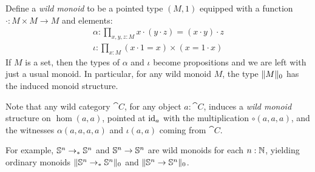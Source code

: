 \documentclass[english,a4paper]{lmcs}
\begin{document}
\begin{rem}
  Define a \emph{wild monoid} to be a pointed type $(M,1)$ equipped with a
  function $\cdot : M \times M \to M$ and elements:
  \begin{gather*}
    \alpha: \prod_{x,y,z:M}x\cdot(y\cdot z) = (x\cdot y) \cdot z \\
    \iota: \prod_{x:M} (x\cdot 1 = x) \times (x = 1 \cdot x)
  \end{gather*}
  If $M$ is a set, then the types of $\alpha$ and $\iota$ become propositions
  and we are left with just a usual monoid. In particular, for any wild monoid
  $M$, the type $\lVert M\rVert_0$ has the induced monoid structure.

  Note that any wild category $\cat C$, for any object $a:\cat C$, induces a
  \emph{wild monoid} structure on $\hom(a,a)$, pointed at $\mathord{\mathrm{id}}_a$ with the
  multiplication $\circ(a,a,a)$, and the witnesses $\alpha(a,a,a,a)$ and $\iota(a,a)$
  coming from $\cat C$.

  For example, ${\mathbb S^{n}} \to_\ast {\mathbb S^{n}}$ and ${\mathbb S^{n}} \to {\mathbb S^{n}}$ are wild monoids for each $n:\mathbb{N}$,
  yielding ordinary  monoids $\lVert{\mathbb S^{n}} \to_\ast {\mathbb S^{n}}\rVert_0$ and $\lVert{\mathbb S^{n}} \to {\mathbb S^{n}}\rVert_0$.
  \label{rem:wild-monoids}
\end{rem}
\end{document}
